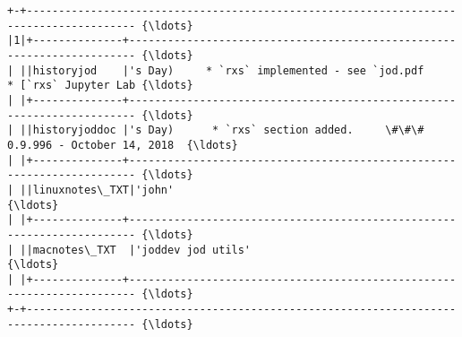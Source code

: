 \documentclass[11pt,letter,landscape]{article}
\begin{document}
    \begin{Verbatim}[commandchars=\\\{\}]
+-+--------------------------------------------------------------------------------------- {\ldots} 
|1|+--------------+----------------------------------------------------------------------- {\ldots} 
| ||historyjod    |'s Day)     * `rxs` implemented - see `jod.pdf     * [`rxs` Jupyter Lab {\ldots} 
| |+--------------+----------------------------------------------------------------------- {\ldots} 
| ||historyjoddoc |'s Day)      * `rxs` section added.     \#\#\# 0.9.996 - October 14, 2018  {\ldots} 
| |+--------------+----------------------------------------------------------------------- {\ldots} 
| ||linuxnotes\_TXT|'john'                                                                  {\ldots} 
| |+--------------+----------------------------------------------------------------------- {\ldots} 
| ||macnotes\_TXT  |'joddev jod utils'                                                      {\ldots} 
| |+--------------+----------------------------------------------------------------------- {\ldots} 
+-+--------------------------------------------------------------------------------------- {\ldots} 

    \end{Verbatim}


    
    
    
    
\end{document}
